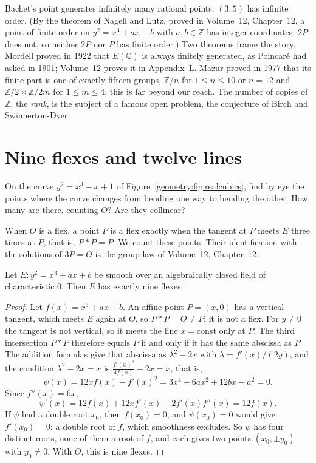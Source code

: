 \begin{remark}
Bachet's point generates infinitely many rational points: $(3,5)$ has infinite order. (By the theorem of Nagell and Lutz, proved in Volume~12, Chapter~12, a
point of finite order on $y^2=x^3+ax+b$ with $a,b\in\mathbb Z$ has integer coordinates; $2P$ does not, so neither $2P$ nor $P$ has finite order.) Two
theorems frame the story. Mordell proved in 1922 that $E(\mathbb Q)$ is always finitely generated, as Poincar\'e had asked in 1901; Volume~12 proves it in
Appendix~L. Mazur proved in 1977 that its finite part is one of exactly fifteen groups, $\mathbb Z/n$ for $1\le n\le10$ or $n=12$ and
$\mathbb Z/2\times\mathbb Z/2m$ for $1\le m\le4$; this is far beyond our reach. The number of copies of $\mathbb Z$, the \emph{rank}, is the subject of a famous open
problem, the conjecture of Birch and Swinnerton-Dyer.
\end{remark}

\section{Nine flexes and twelve lines}

\begin{think}
On the curve $y^2=x^3-x+1$ of Figure~\ref{geometry:fig:realcubics}, find by eye the points where the curve changes from bending one way to bending the other. How many
are there, counting $O$? Are they collinear?
\end{think}

When $O$ is a flex, a point $P$ is a flex exactly when the tangent at $P$ meets $E$ three times at $P$, that is, $P*P=P$. We count these points. Their identification with the solutions of $3P=O$ is the group law of Volume~12, Chapter~12.

\begin{theorem}\label{geometry:thm:nineflexes}
Let $E:y^2=x^3+ax+b$ be smooth over an algebraically closed field of characteristic $0$. Then $E$ has exactly nine flexes.
\end{theorem}

\begin{proof}
Let $f(x)=x^3+ax+b$. An affine point $P=(x,0)$ has a vertical tangent, which meets $E$ again at $O$, so $P*P=O\ne P$: it is not a flex. For $y\ne0$ the tangent is not vertical, so it meets the line $x=\mathrm{const}$ only at $P$. The third intersection $P*P$ therefore equals $P$ if and only if it has the same abscissa as $P$. The addition formulas give that abscissa as $\lambda^2-2x$ with $\lambda=f'(x)/(2y)$, and the condition $\lambda^2-2x=x$ is $\frac{f'(x)^2}{4f(x)}-2x=x$, that is,
\[
\psi(x)=12xf(x)-f'(x)^2=3x^4+6ax^2+12bx-a^2=0.
\]
Since $f''(x)=6x$,
\[
\psi'(x)=12f(x)+12xf'(x)-2f'(x)f''(x)=12f(x).
\] If $\psi$ had a double root $x_0$, then $f(x_0)=0$, and $\psi(x_0)=0$ would give
$f'(x_0)=0$: a double root of $f$, which smoothness excludes. So $\psi$ has four distinct roots, none of them a root of $f$, and each gives two points
$(x_0,\pm y_0)$ with $y_0\ne0$. With $O$, this is nine flexes.
\end{proof}

